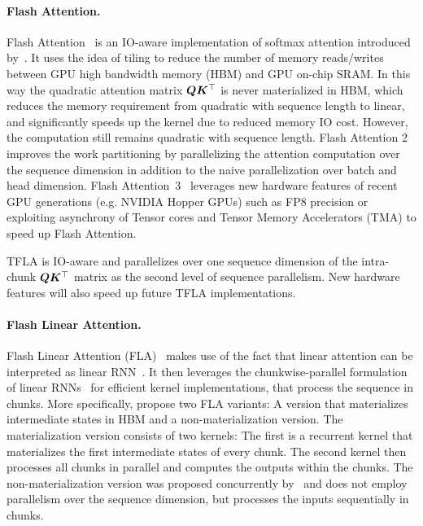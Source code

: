 \documentclass{article}
\begin{document}
\paragraph{Flash Attention.}
Flash Attention~\citep{dao:22flashattention} is an IO-aware implementation of softmax attention introduced by~\citep{vaswani:17attention}.
It uses the idea of tiling to reduce the number of memory reads/writes between GPU high bandwidth memory (HBM) and GPU on-chip SRAM.
In this way the quadratic attention matrix $\bm{Q} \bm{K}^\top$ is never materialized in HBM, which reduces the memory requirement from quadratic with sequence length to linear, and significantly speeds up the kernel due to reduced memory IO cost.
However, the computation still remains quadratic with sequence length.
Flash Attention 2~\citep{dao:23flashattention2} improves the work partitioning by parallelizing the attention computation over the sequence dimension in addition to the naive parallelization over batch and head dimension.
Flash Attention~3~\citep{shah:24flashattention3} leverages new hardware features of recent GPU generations (e.g. NVIDIA Hopper GPUs) such as FP8 precision or exploiting asynchrony of Tensor cores and Tensor Memory Accelerators (TMA) to speed up Flash Attention.

TFLA is IO-aware and parallelizes over one sequence dimension of the intra-chunk $\bm{Q} \bm{K}^\top$ matrix as the second level of sequence parallelism.
New hardware features will also speed up future TFLA implementations.
\paragraph{Flash Linear Attention.}
Flash Linear Attention (FLA)~\citep{yang:24gated, yang:24fla} makes use of the fact that linear attention can be interpreted as linear RNN~\citep{katharopoulos:20linearattention}.
It then leverages the chunkwise-parallel formulation of linear RNNs~\citep{Hua:22transformerlineartime, sun:23retentive} for efficient kernel implementations, that process the sequence in chunks.
More specifically, \citet{yang:24gated} propose two FLA variants: A version that materializes intermediate states in HBM and a non-materialization version.
The materialization version consists of two kernels: The first is a recurrent kernel that materializes the first intermediate states of every chunk.
The second kernel then processes all chunks in parallel and computes the outputs within the chunks.
The non-materialization version was proposed concurrently by~\citet{qin:24lightningattention2} and does not employ parallelism over the sequence dimension, but processes the inputs sequentially in chunks.
\end{document}

